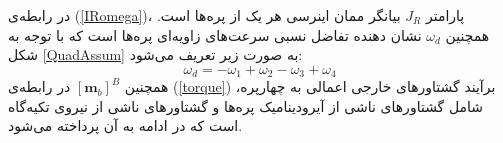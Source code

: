 در رابطه‌ی
(\ref{IRomega})، پارامتر
$J_R$
بیانگر ممان اینرسی هر یک از پره‌ها است. همچنین
$\omega_d$
نشان دهنده تفاضل نسبی سرعت‌های زاویه‌ای پره‌ها است که با توجه به شكل
\ref{QuadAssum}
به صورت زیر تعریف می‌شود:
\begin{equation}\label{omega_d}
	\omega_d = -\omega_1 + \omega_2-\omega_3 + \omega_4
\end{equation}
همچنین 
$\left[\boldsymbol m_b\right]^B$
در رابطه‌ی
(\ref{torque})
برآیند گشتاورهای خارجی اعمالی به چهارپره، شامل 
گشتاورهای ناشی از آیرودینامیک پره‌ها و گشتاورهای ناشی از نیروی تكیه‌گاه است که در ادامه به آن پرداخته می‌شود.



